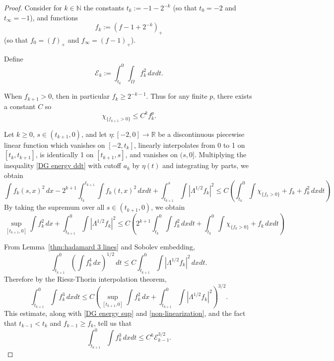 \documentclass[11pt]{amsart}
\theoremstyle{remark}
\theoremstyle{definition}
\newcommand{\R}{\mathbb{R}}
\newcommand{\N}{\mathbb{N}}
\newcommand{\E}{\mathcal{E}}
\newcommand{\paren}[1]{\left( #1 \right)}
\newcommand{\abs}[1]{\left\lvert #1 \right\rvert}
\newcommand{\indic}[1]{\chi_{\{#1\}}}
\newcommand{\HD}{\mathcal{H}}
\newcommand{\HDint}[2]{\int \abs{\Lambda^{#1} #2}^2}
\begin{document}
\begin{proof}
Consider for $k \in \N$ the constants $t_k := -1 - 2^{-k}$ (so that $t_0 = -2$ and $t_\infty = -1$), and functions
\[ f_k := (f - 1 + 2^{-k})_+ \]
(so that $f_0 = (f)_+$ and $f_\infty = (f-1)_+$).  

Define
\[ \E_k := \int_{t_k}^0 \int_\Omega f_k^2 \,dxdt. \]

When $f_{k+1}>0$, then in particular $f_k \geq 2^{-k-1}$.  Thus for any finite $p$, there exists a constant $C$ so
\begin{equation} \label{non-linearization} \indic{f_{k+1}>0} \leq C^k f_k^p. \end{equation}

Let $k\geq 0$, $s \in (t_{k+1},0)$, and let $\eta:[-2,0]\to \R$ be a discontinuous piecewise linear function which vanishes on $[-2,t_k]$, linearly interpolates from 0 to 1 on $[t_k, t_{k+1}]$, is identically 1 on $[t_{k+1}, s]$, and vanishes on $(s,0]$.  Multiplying the inequality \eqref{DG energy ddt} with cutoff $a_k$ by $\eta(t)$ and integrating by parts, we obtain
\[ \int f_k(s,x)^2\,dx - 2^{k+1} \int_{t_k}^{t_{k+1}} \int f_k(t,x)^2 \,dxdt + \int_{t_{k+1}}^s \HDint{1/2}{f_k} \leq C \paren{ \int_{t_k}^0 \int \indic{f_k>0} + f_k + f_k^2 \,dxdt } \]
By taking the supremum over all $s \in (t_{k+1},0)$, we obtain
\begin{equation} \label{DG energy sup}
\sup_{[t_{k+1},0]} \int f_k^2 \,dx + \int_{t_{k+1}}^0 \HDint{1/2}{f_k} \leq C \paren{ 2^{k+1} \int_{t_k}^0 \int f_k^2\,dxdt + \int_{t_k}^0 \int \indic{f_k > 0} + f_k \,dxdt } 
\end{equation}


From Lemma~\ref{thm:hadamard 3 lines} and Sobolev embedding, 
\[ \int_{t_{k+1}}^0 \paren{ \int f_k^4 \,dx }^{1/2} \,dt \leq C \int_{t_{k+1}}^0 \HDint{1/2}{f_k} \,dxdt. \]
Therefore by the Riesz-Thorin interpolation theorem,
\[ \int_{t_{k+1}}^0 \int f_k^3 \,dxdt \leq C \paren{ \sup_{[t_{k+1},0]} \int f_k^2 \,dx + \int_{t_{k+1}}^0 \HDint{1/2}{f_k} }^{3/2}. \]
This estimate, along with \eqref{DG energy sup} and \eqref{non-linearization}, and the fact that $t_{k-1} < t_k$ and $f_{k-1} \geq f_k$, tell us that
\[ \int_{t_{k+1}}^0 \int f_k^3 \,dxdt \leq C^k \E_{k-1}^{3/2}. \]


\end{proof}
\end{document}
